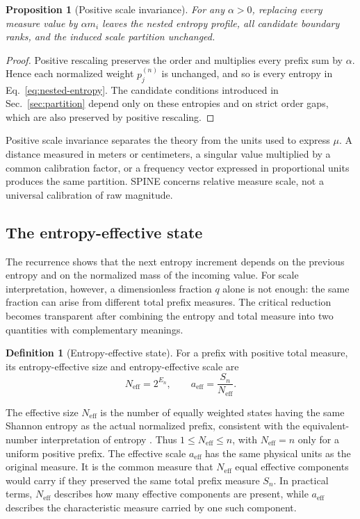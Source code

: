 \documentclass[aip,cha,reprint,superscriptaddress,floatfix]{revtex4-2}
\newtheorem{proposition}[theorem]{Proposition}
\theoremstyle{definition}
\newtheorem{definition}[theorem]{Definition}
\theoremstyle{remark}
\newcommand{\Neff}{N_{\mathrm{eff}}}
\newcommand{\aeff}{a_{\mathrm{eff}}}
\begin{document}
\begin{proposition}[Positive scale invariance]
\label{prop:scale-invariance}
For any \(\alpha>0\), replacing every measure value by \(\alpha m_i\) leaves the nested entropy profile, all candidate boundary ranks, and the induced scale partition unchanged.
\end{proposition}

\begin{proof}
Positive rescaling preserves the order and multiplies every prefix sum by \(\alpha\). Hence each normalized weight \(p_j^{(n)}\) is unchanged, and so is every entropy in Eq.~\eqref{eq:nested-entropy}. The candidate conditions introduced in Sec.~\ref{sec:partition} depend only on these entropies and on strict order gaps, which are also preserved by positive rescaling.
\end{proof}

Positive scale invariance separates the theory from the units used to express \(\mu\). A distance measured in meters or centimeters, a singular value multiplied by a common calibration factor, or a frequency vector expressed in proportional units produces the same partition. SPINE concerns relative measure scale, not a universal calibration of raw magnitude.

\subsection{The entropy-effective state}
\label{sec:effective-state}

The recurrence shows that the next entropy increment depends on the previous entropy and on the normalized mass of the incoming value. For scale interpretation, however, a dimensionless fraction \(q\) alone is not enough: the same fraction can arise from different total prefix measures. The critical reduction becomes transparent after combining the entropy and total measure into two quantities with complementary meanings.

\begin{definition}[Entropy-effective state]
\label{def:effective-state}
For a prefix with positive total measure, its entropy-effective size and entropy-effective scale are
\begin{equation}
\Neff=2^{E_n},
\qquad
\aeff=\frac{S_n}{\Neff}.
\label{eq:effective-state}
\end{equation}
\end{definition}

The effective size \(\Neff\) is the number of equally weighted states having the same Shannon entropy as the actual normalized prefix, consistent with the equivalent-number interpretation of entropy \cite{hill1973,jost2006}. Thus \(1\le\Neff\le n\), with \(\Neff=n\) only for a uniform positive prefix. The effective scale \(\aeff\) has the same physical units as the original measure. It is the common measure that \(\Neff\) equal effective components would carry if they preserved the same total prefix measure \(S_n\). In practical terms, \(\Neff\) describes how many effective components are present, while \(\aeff\) describes the characteristic measure carried by one such component.
\end{document}
